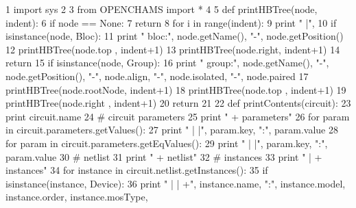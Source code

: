 \begin{DoxyCodeInclude}
1 \textcolor{keyword}{import} sys
2 
3 \textcolor{keyword}{from} OPENCHAMS \textcolor{keyword}{import} *
4 
5 \textcolor{keyword}{def }printHBTree(node, indent):
6     \textcolor{keywordflow}{if} node == \textcolor{keywordtype}{None}:
7         \textcolor{keywordflow}{return}
8     \textcolor{keywordflow}{for} i \textcolor{keywordflow}{in} range(indent):
9         \textcolor{keywordflow}{print} \textcolor{stringliteral}{" |"},
10     \textcolor{keywordflow}{if} isinstance(node, Bloc):
11         \textcolor{keywordflow}{print} \textcolor{stringliteral}{" bloc:"}, node.getName(), \textcolor{stringliteral}{"-"}, node.getPosition()
12         printHBTree(node.top  , indent+1)
13         printHBTree(node.right, indent+1)
14         \textcolor{keywordflow}{return}
15     \textcolor{keywordflow}{if} isinstance(node, Group):
16         \textcolor{keywordflow}{print} \textcolor{stringliteral}{" group:"}, node.getName(), \textcolor{stringliteral}{"-"}, node.getPosition(), \textcolor{stringliteral}{"-"}, node.align, \textcolor{stringliteral}{"-"}, node.isolated, \textcolor{stringliteral}{"-"},
       node.paired
17         printHBTree(node.rootNode, indent+1)
18         printHBTree(node.top     , indent+1)
19         printHBTree(node.right   , indent+1)
20         \textcolor{keywordflow}{return}
21 
22 \textcolor{keyword}{def }printContents(circuit):
23   \textcolor{keywordflow}{print} circuit.name
24   \textcolor{comment}{# circuit parameters}
25   \textcolor{keywordflow}{print} \textcolor{stringliteral}{" + parameters"}
26   \textcolor{keywordflow}{for} param \textcolor{keywordflow}{in} circuit.parameters.getValues():
27     \textcolor{keywordflow}{print} \textcolor{stringliteral}{" | |"}, param.key, \textcolor{stringliteral}{":"}, param.value
28   \textcolor{keywordflow}{for} param \textcolor{keywordflow}{in} circuit.parameters.getEqValues():
29     \textcolor{keywordflow}{print} \textcolor{stringliteral}{" | |"}, param.key, \textcolor{stringliteral}{":"}, param.value
30   \textcolor{comment}{# netlist}
31   \textcolor{keywordflow}{print} \textcolor{stringliteral}{" + netlist"}
32   \textcolor{comment}{#  instances}
33   \textcolor{keywordflow}{print} \textcolor{stringliteral}{" | + instances"}
34   \textcolor{keywordflow}{for} instance \textcolor{keywordflow}{in} circuit.netlist.getInstances():
35     \textcolor{keywordflow}{if} isinstance(instance, Device): 
36       \textcolor{keywordflow}{print} \textcolor{stringliteral}{" | | +"}, instance.name, \textcolor{stringliteral}{":"}, instance.model, instance.order, instance.mosType, 

\end{DoxyCodeInclude}
